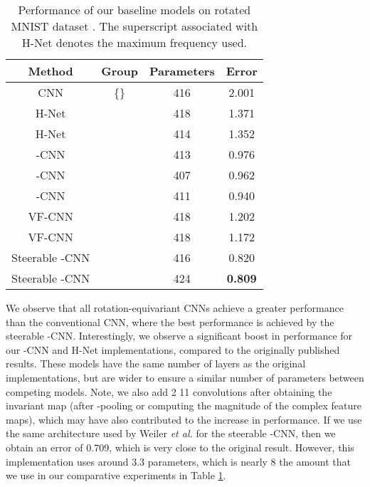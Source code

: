 \documentclass[journal]{IEEEtran}
\begin{document}
{	\begin{table}[h]
	\begin{center}
		\caption{Performance of our baseline models on rotated MNIST dataset \cite{larochelle2007empirical}. The superscript associated with H-Net denotes the maximum frequency used.}
		\label{dup1 table:comparative_rotmnist}
		\setlength{\tabcolsep}{3pt} \renewcommand{\arraystretch}{1.0} \begin{tabular}{c|c|c|c}
			 \textbf{Method} & \textbf{Group}  & \textbf{Parameters}  &  \textbf{Error}  \\
			\midrule
            CNN & \{\} & 416  & 2.001 \\
            H-Net \cite{worrall2017harmonic} &  & 418  & 1.371   \\
            H-Net \cite{worrall2017harmonic} &  & 414  & 1.352 \\
            -CNN \cite{cohen2016group} &  & 413  & 0.976   \\
            -CNN \cite{bekkers2018roto,lafarge2020roto} &  & 407  & 0.962   \\
            -CNN \cite{bekkers2018roto,lafarge2020roto} &  & 411  & 0.940   \\
            VF-CNN \cite{marcos2017rotation} &  & 418 & 1.202   \\
            VF-CNN \cite{marcos2017rotation} &  & 418 & 1.172   \\
            Steerable -CNN \cite{weiler2018learning} &  & 416 & 0.820  \\
            Steerable -CNN \cite{weiler2018learning} &  & 424 & \textbf{0.809}  \\
			\bottomrule
		\end{tabular}
	\end{center}
	\end{table}	
	
	We observe that all rotation-equivariant CNNs achieve a greater performance than the conventional CNN, where the best performance is achieved by the  steerable -CNN. Interestingly, we observe a significant boost in performance for our  -CNN and H-Net implementations, compared to the originally published results. These models have the same number of layers as the original implementations, but are wider to ensure a similar number of parameters between competing models. Note, we also add 2 11 convolutions after obtaining the invariant map (after -pooling or computing the magnitude of the complex feature maps), which may have also contributed to the increase in performance. If we use the same architecture used by Weiler \textit{et al.} for the  steerable -CNN, then we obtain an error of 0.709, which is very close to the original result. However, this implementation uses around 3.3 parameters, which is nearly 8 the amount that we use in our comparative experiments in Table \ref{dup1 table:comparative_rotmnist}.
	
}
\end{document}
